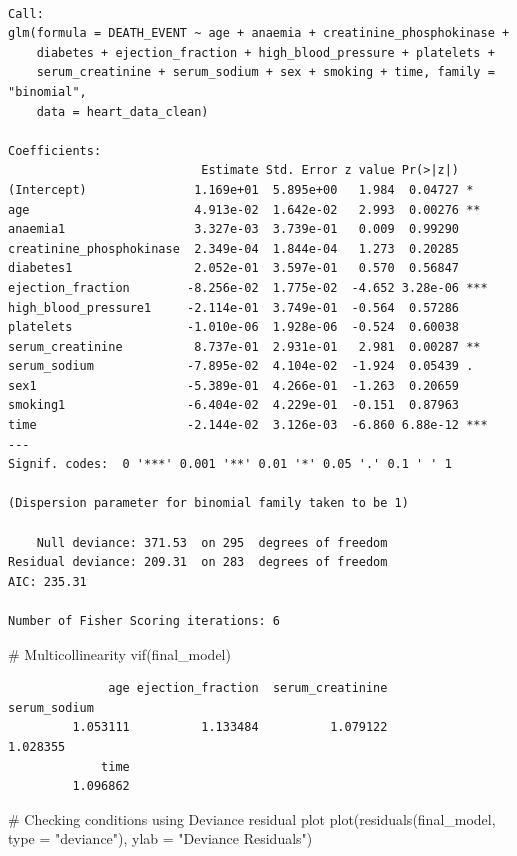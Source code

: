\documentclass[
  letterpaper,
  DIV=11,
  numbers=noendperiod]{scrartcl}
\newenvironment{Shaded}{\begin{snugshade}}{\end{snugshade}}
\newcommand{\AttributeTok}[1]{\textcolor[rgb]{0.40,0.45,0.13}{#1}}
\newcommand{\CommentTok}[1]{\textcolor[rgb]{0.37,0.37,0.37}{#1}}
\newcommand{\FunctionTok}[1]{\textcolor[rgb]{0.28,0.35,0.67}{#1}}
\newcommand{\NormalTok}[1]{\textcolor[rgb]{0.00,0.23,0.31}{#1}}
\newcommand{\StringTok}[1]{\textcolor[rgb]{0.13,0.47,0.30}{#1}}
\begin{document}
\begin{verbatim}

Call:
glm(formula = DEATH_EVENT ~ age + anaemia + creatinine_phosphokinase + 
    diabetes + ejection_fraction + high_blood_pressure + platelets + 
    serum_creatinine + serum_sodium + sex + smoking + time, family = "binomial", 
    data = heart_data_clean)

Coefficients:
                           Estimate Std. Error z value Pr(>|z|)    
(Intercept)               1.169e+01  5.895e+00   1.984  0.04727 *  
age                       4.913e-02  1.642e-02   2.993  0.00276 ** 
anaemia1                  3.327e-03  3.739e-01   0.009  0.99290    
creatinine_phosphokinase  2.349e-04  1.844e-04   1.273  0.20285    
diabetes1                 2.052e-01  3.597e-01   0.570  0.56847    
ejection_fraction        -8.256e-02  1.775e-02  -4.652 3.28e-06 ***
high_blood_pressure1     -2.114e-01  3.749e-01  -0.564  0.57286    
platelets                -1.010e-06  1.928e-06  -0.524  0.60038    
serum_creatinine          8.737e-01  2.931e-01   2.981  0.00287 ** 
serum_sodium             -7.895e-02  4.104e-02  -1.924  0.05439 .  
sex1                     -5.389e-01  4.266e-01  -1.263  0.20659    
smoking1                 -6.404e-02  4.229e-01  -0.151  0.87963    
time                     -2.144e-02  3.126e-03  -6.860 6.88e-12 ***
---
Signif. codes:  0 '***' 0.001 '**' 0.01 '*' 0.05 '.' 0.1 ' ' 1

(Dispersion parameter for binomial family taken to be 1)

    Null deviance: 371.53  on 295  degrees of freedom
Residual deviance: 209.31  on 283  degrees of freedom
AIC: 235.31

Number of Fisher Scoring iterations: 6
\end{verbatim}

\begin{Shaded}
\begin{Highlighting}[]
\CommentTok{\# Multicollinearity}
\FunctionTok{vif}\NormalTok{(final\_model)}
\end{Highlighting}
\end{Shaded}

\begin{verbatim}
              age ejection_fraction  serum_creatinine      serum_sodium 
         1.053111          1.133484          1.079122          1.028355 
             time 
         1.096862 
\end{verbatim}

\begin{Shaded}
\begin{Highlighting}[]
\CommentTok{\# Checking conditions using Deviance residual plot}
\FunctionTok{plot}\NormalTok{(}\FunctionTok{residuals}\NormalTok{(final\_model, }\AttributeTok{type =} \StringTok{"deviance"}\NormalTok{), }\AttributeTok{ylab =} \StringTok{"Deviance Residuals"}\NormalTok{)}
\end{Highlighting}
\end{Shaded}
\end{document}

